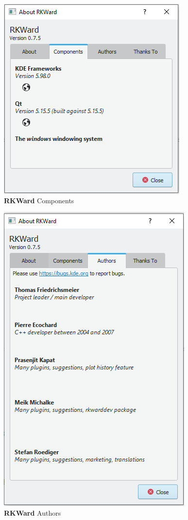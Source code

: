 \documentclass[
  letterpaper,
  DIV=11,
  numbers=noendperiod]{scrreprt}
\begin{document}
\begin{figure}

{\centering \includegraphics{./images/about_components.png}

}

\caption{\textbf{RKWard} Components}

\end{figure}

\begin{figure}

{\centering \includegraphics{./images/about_authors.png}

}

\caption{\textbf{RKWard} Authors}

\end{figure}
\end{document}
